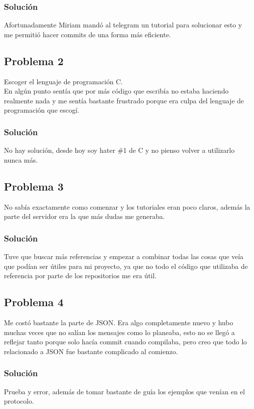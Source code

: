\documentclass[12pt,a4paper]{article}
\begin{document}
\subsubsection{Solución}
Afortunadamente Miriam mandó al telegram un tutorial para solucionar esto 
y me permitió hacer commits de una forma más eficiente.

\subsection{Problema 2}
Escoger el lenguaje de programación C.\\
En algún punto sentía que por más código que escribía no estaba haciendo
realmente nada y me sentía bastante frustrado porque era culpa del 
lenguaje de programación que escogí.

\subsubsection{Solución}
No hay solución, desde hoy soy hater \#1 de C y no pienso volver a 
utilizarlo nunca más.

\subsection{Problema 3}
No sabía exactamente como comenzar y los tutoriales eran poco claros,
además la parte del servidor era la que más dudas me generaba.

\subsubsection{Solución}
Tuve que buscar más referencias y empezar a combinar todas las cosas
que veía que podían ser útiles para mi proyecto, ya que no todo el 
código que utilizaba de referencia por parte de los repositorios me era
útil.

\subsection{Problema 4}
Me costó bastante la parte de JSON.
Era algo completamente nuevo y hubo muchas veces que no salían los mensajes
como lo planeaba, esto no se llegó a reflejar tanto porque solo hacía commit
cuando compilaba, pero creo que todo lo relacionado a JSON fue bastante 
complicado al comienzo.

\subsubsection{Solución}
Prueba y error, además de tomar bastante de guía los ejemplos que venían
en el protocolo.
\end{document}
